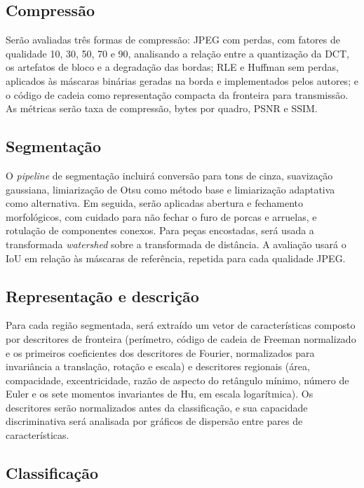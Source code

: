 \documentclass[12pt]{article}
\begin{document}
\subsection{Compressão}

Serão avaliadas três formas de compressão: JPEG com perdas, com fatores de qualidade 10, 30, 50, 70 e 90, analisando a relação entre a quantização da DCT, os artefatos de bloco e a degradação das bordas; RLE e Huffman sem perdas, aplicados às máscaras binárias geradas na borda e implementados pelos autores; e o código de cadeia como representação compacta da fronteira para transmissão. As métricas serão taxa de compressão, bytes por quadro, PSNR e SSIM.

\subsection{Segmentação}

O \textit{pipeline} de segmentação incluirá conversão para tons de cinza, suavização gaussiana, limiarização de Otsu como método base e limiarização adaptativa como alternativa. Em seguida, serão aplicadas abertura e fechamento morfológicos, com cuidado para não fechar o furo de porcas e arruelas, e rotulação de componentes conexos. Para peças encostadas, será usada a transformada \textit{watershed} sobre a transformada de distância. A avaliação usará o IoU em relação às máscaras de referência, repetida para cada qualidade JPEG.

\subsection{Representação e descrição}

Para cada região segmentada, será extraído um vetor de características composto por descritores de fronteira (perímetro, código de cadeia de Freeman normalizado e os primeiros coeficientes dos descritores de Fourier, normalizados para invariância a translação, rotação e escala) e descritores regionais (área, compacidade, excentricidade, razão de aspecto do retângulo mínimo, número de Euler e os sete momentos invariantes de Hu, em escala logarítmica). Os descritores serão normalizados antes da classificação, e sua capacidade discriminativa será analisada por gráficos de dispersão entre pares de características.

\subsection{Classificação}
\end{document}
